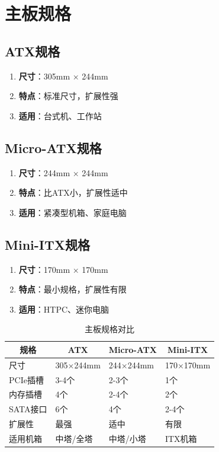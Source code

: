 \documentclass[12pt,UTF8]{ctexbook}
\begin{document}
\chapter{主板规格}

\section{ATX规格}

\begin{enumerate}
    \item \textbf{尺寸}：305mm × 244mm
    \item \textbf{特点}：标准尺寸，扩展性强
    \item \textbf{适用}：台式机、工作站
\end{enumerate}

\section{Micro-ATX规格}

\begin{enumerate}
    \item \textbf{尺寸}：244mm × 244mm
    \item \textbf{特点}：比ATX小，扩展性适中
    \item \textbf{适用}：紧凑型机箱、家庭电脑
\end{enumerate}

\section{Mini-ITX规格}

\begin{enumerate}
    \item \textbf{尺寸}：170mm × 170mm
    \item \textbf{特点}：最小规格，扩展性有限
    \item \textbf{适用}：HTPC、迷你电脑
\end{enumerate}

\begin{table}[H]
    \centering
    \begin{tabularx}{\textwidth}{|p{3cm}|X|X|X|}
        \hline
        \multicolumn{1}{|c|}{\textbf{规格}} & \multicolumn{1}{c|}{\textbf{ATX}} & \multicolumn{1}{c|}{\textbf{Micro-ATX}} & \multicolumn{1}{c|}{\textbf{Mini-ITX}} \\
        \hline
        尺寸 & 305×244mm & 244×244mm & 170×170mm \\
        \hline
        PCIe插槽 & 3-4个 & 2-3个 & 1个 \\
        \hline
        内存插槽 & 4个 & 2-4个 & 2个 \\
        \hline
        SATA接口 & 6个 & 4个 & 2-4个 \\
        \hline
        扩展性 & 最强 & 适中 & 有限 \\
        \hline
        适用机箱 & 中塔/全塔 & 中塔/小塔 & ITX机箱 \\
        \hline
    \end{tabularx}
    \caption{主板规格对比}
    \label{tab:motherboard_specs}
\end{table}
\end{document}
